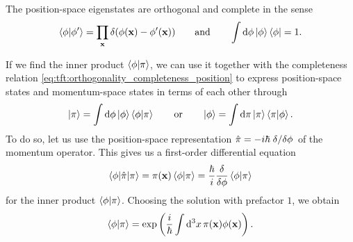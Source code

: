 The position-space eigenstates are orthogonal and complete in the sense
\begin{equation}
	\braket{\phi | \phi'} = \prod_{\mathbf{x}} \delta(\phi(\mathbf{x}) - \phi'(\mathbf{x}))
	\qquad \text{and} \qquad
	\int \mathop{}\!\mathrm{d} \phi \ket{\phi} \bra{\phi} = 1 .
	\label{eq:tft:orthogonality_completeness_position}
\end{equation}

\newcommand{\posmom}[2]{\exp \left(  \frac{i}{\hbar} \int \dif^3 x \, #2(\vec{x}) #1(\vec{x}) \right)}
\newcommand{\mompos}[2]{\exp \left( -\frac{i}{\hbar} \int \dif^3 x \, #1(\vec{x}) #2(\vec{x}) \right)}
If we find the inner product $\braket{\phi | \pi}$, we can use it together with the completeness relation \eqref{eq:tft:orthogonality_completeness_position} to express position-space states and momentum-space states in terms of each other through
\begin{equation}
	\ket\pi = \int \dif \phi \ket\phi \braket{\phi | \pi} %
	\qquad \text{or} \qquad
	\ket\phi = \int \dif \pi \ket\pi \braket{\pi | \phi} . %
\end{equation}
To do so, let us use the position-space representation $\hat{\pi} = -i \hbar \fdv{}/{\phi}$ of the momentum operator.
This gives us a first-order differential equation
\begin{equation}
	\braket{\phi | \hat{\pi} | \pi} = \pi(\vec{x}) \braket{\phi | \pi} = \frac{\hbar}{i} \fdv*{\braket{\phi | \pi}}{\phi}
\end{equation}
for the inner product $\braket{\phi | \pi}$.
Choosing the solution with prefactor $1$, we obtain
\begin{equation}
	\braket{\phi | \pi} = \posmom{\phi}{\pi} .
	\label{eq:tft:inner_product_position_momentum}
\end{equation}

